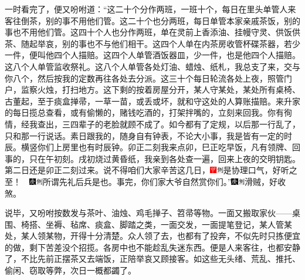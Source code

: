 一时看完了，便又吩咐道：``这二十个分作两班，一班十个，每日在里头单管人来客往倒茶，别的事不用他们管。这二十个也分两班，每日单管本家亲戚茶饭，别的事也不用他们管。这四十个人也分作两班，单在灵前上香添油、挂幔守灵、供饭供茶、随起举哀，别的事也不与他们相干。这四个人单在内茶房收管杯碟茶器，若少一件，便叫他四个人描赔。这四个人单管酒饭器皿，少一件，也是他四个人描赔。这八个人单管监收祭礼。这八个人单管各处灯油、蜡烛、纸札，我总支了来，交与你八个，然后按我的定数再往各处去分派。这三十个每日轮流各处上夜，照管门户，监察火烛，打扫地方。这下剩的按着房屋分开，某人守某处，某处所有桌椅、古董起，至于痰盒掸帚，一草一苗，或丢或坏，就和守这处的人算账描赔。来升家的每日揽总查看，或有偷懒的，赌钱吃酒的，打架拌嘴的，立刻来回我。你有徇情，经我查出，三四辈子的老脸就顾不成了。如今都有了定规，以后那一行乱了，只和那一行说话。素日跟我的，随身自有钟表，不论大小事，我是皆有一定的时辰。横竖你们上房里也有时辰钟。卯正二刻我来点卯，巳正吃早饭，凡有领牌、回事的，只在午初刻。戌初烧过黄昏纸，我亲到各处查一遍，回来上夜的交明钥匙。第二日还是卯正二刻过来。说不得咱们大家辛苦这几日，{\includegraphics[width=3mm]{../Images/00002}\includegraphics[width=3mm]{../Images/00011}\footnotesize \kaishu 是协理口气，好听之至！　\includegraphics[width=3mm]{../Images/00004}\includegraphics[width=3mm]{../Images/00011}\footnotesize \kaishu 所谓先礼后兵是也。}事完，你们家大爷自然赏你们。''{\includegraphics[width=3mm]{../Images/00004}\includegraphics[width=3mm]{../Images/00011}\footnotesize \kaishu 滑贼，好收煞。}

说毕，又吩咐按数发与茶叶、油烛、鸡毛掸子、笤帚等物。一面又搬取家伙------桌围、椅搭、坐褥、毡席、痰盒、脚踏之类，一面交发，一面提笔登记，某人管某处，某人领某物，开得十分清楚。众人领了去，也都有了投奔，不似先时只拣便宜的做，剩下苦差没个招揽。各房中也不能趁乱失迷东西。便是人来客往，也都安静了，不比先前正摆茶又去端饭，正陪举哀又顾接客。如这些无头绪、荒乱、推托、偷闲、窃取等弊，次日一概都蠲了。

